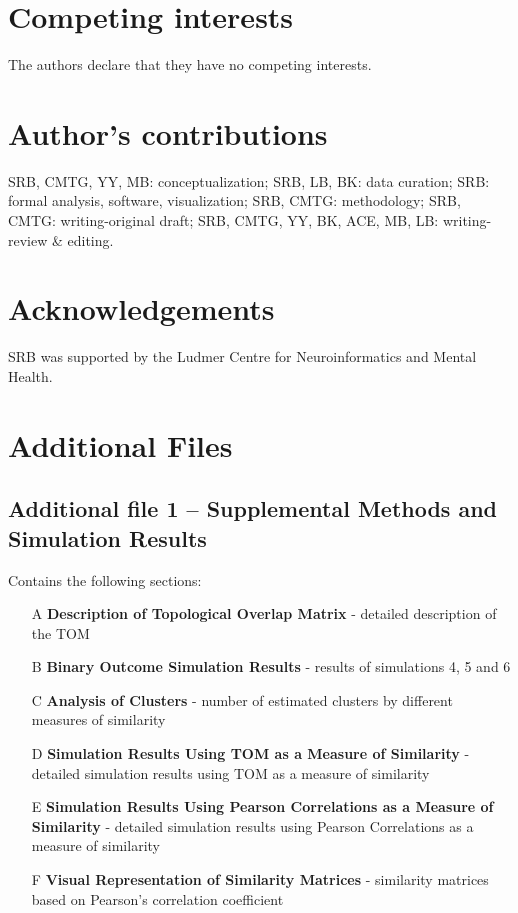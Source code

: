 \section*{Competing interests}
The authors declare that they have no competing interests.

\section*{Author's contributions}
SRB, CMTG, YY, MB: conceptualization; SRB, LB, BK: data curation; SRB: formal analysis, software, visualization; SRB, CMTG: methodology; SRB, CMTG: writing-original draft; SRB, CMTG, YY, BK, ACE, MB, LB: writing-review \& editing. 

\section*{Acknowledgements}
SRB was supported by the Ludmer Centre for Neuroinformatics and Mental Health.

\section*{Additional Files}
\subsection*{Additional file 1 -- Supplemental Methods and Simulation Results}
Contains the following sections:
\begin{itemize}
	\item[A] \textbf{Description of Topological Overlap Matrix} -  detailed description of the TOM
	\item[B] \textbf{Binary Outcome Simulation Results} - results of simulations 4, 5 and 6
	\item[C] \textbf{Analysis of Clusters} - number of estimated clusters by different measures of similarity	
	\item[D] \textbf{Simulation Results Using TOM as a Measure of Similarity} - detailed simulation results using TOM as a measure of similarity
	\item[E] \textbf{Simulation Results Using Pearson Correlations as a Measure of
		Similarity} - detailed simulation results using Pearson Correlations as a measure of similarity	
	\item[F] \textbf{Visual Representation of Similarity Matrices} - similarity matrices based on Pearson's correlation coefficient
	
\end{itemize}
